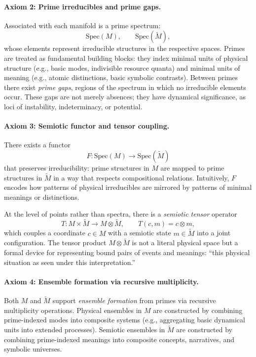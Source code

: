 \documentclass[12]{amsart}
\theoremstyle{plain}
\begin{document}
\paragraph{Axiom 2: Prime irreducibles and prime gaps.}

Associated with each manifold is a prime spectrum:
\[
  \mathrm{Spec}(M), \qquad \mathrm{Spec}(\tilde M),
\]
whose elements represent irreducible structures in the respective spaces. Primes are treated as fundamental building blocks: they index minimal units of physical structure (e.g., basic modes, indivisible resource quanta) and minimal units of meaning (e.g., atomic distinctions, basic symbolic contrasts). Between primes there exist \emph{prime gaps}, regions of the spectrum in which no irreducible elements occur. These gaps are not merely absences; they have dynamical significance, as loci of instability, indeterminacy, or potential.

\paragraph{Axiom 3: Semiotic functor and tensor coupling.}

There exists a functor
\[
  F : \mathrm{Spec}(M) \longrightarrow \mathrm{Spec}(\tilde M)
\]
that preserves irreducibility: prime structures in $M$ are mapped to prime structures in $\tilde M$ in a way that respects compositional relations. Intuitively, $F$ encodes how patterns of physical irreducibles are mirrored by patterns of minimal meanings or distinctions.

At the level of points rather than spectra, there is a \emph{semiotic tensor} operator
\[
  T : M \times \tilde M \longrightarrow M \otimes \tilde M,\qquad
  T(c,m) = c \otimes m,
\]
which couples a coordinate $c \in M$ with a semiotic state $m \in \tilde M$ into a joint configuration. The tensor product $M \otimes \tilde M$ is not a literal physical space but a formal device for representing bound pairs of events and meanings: ``this physical situation as seen under this interpretation.''

\paragraph{Axiom 4: Ensemble formation via recursive multiplicity.}

Both $M$ and $\tilde M$ support \emph{ensemble formation} from primes via recursive multiplicity operations. Physical ensembles in $M$ are constructed by combining prime-indexed modes into composite systems (e.g., aggregating basic dynamical units into extended processes). Semiotic ensembles in $\tilde M$ are constructed by combining prime-indexed meanings into composite concepts, narratives, and symbolic universes.
\end{document}
